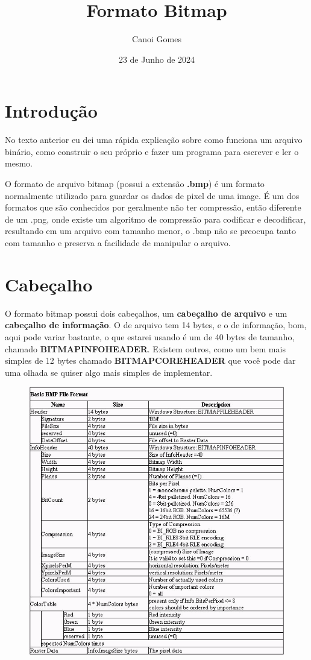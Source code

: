 \documentclass[a4paper,oneside,12pt]{article}
\title{Formato Bitmap}
\author{Canoi Gomes}
\date{23 de Junho de 2024}
\begin{document}
\maketitle
\newpage
\tableofcontents
\newpage
\section{Introdução}

No texto anterior eu dei uma rápida explicação sobre como funciona um arquivo binário, como construir o seu próprio e fazer um programa para escrever e ler o mesmo.

O formato de arquivo bitmap (possui a extensão \textbf{.bmp}) é um formato normalmente utilizado para guardar os dados de pixel de uma image. É um dos formatos que são conhecidos por geralmente não ter compressão, então diferente de um .png, onde existe um algoritmo de compressão para codificar e decodificar, resultando em um arquivo com tamanho menor, o .bmp não se preocupa tanto com tamanho e preserva a facilidade de manipular o arquivo.

\section{Cabeçalho}

O formato bitmap possui dois cabeçalhos, um \textbf{cabeçalho de arquivo} e um \textbf{cabeçalho de informação}. O de arquivo tem 14 bytes, e o de informação, bom, aqui pode variar bastante, o que estarei usando é um de 40 bytes de tamanho, chamado \textbf{BITMAPINFOHEADER}. Existem outros, como um bem mais simples de 12 bytes chamado \textbf{BITMAPCOREHEADER} que você pode dar uma olhada se quiser algo mais simples de implementar.

\begin{figure}[ht]
    \centering
    \includegraphics[width=\linewidth]{media/bmp_header.png}
\end{figure}
\break
\end{document}
